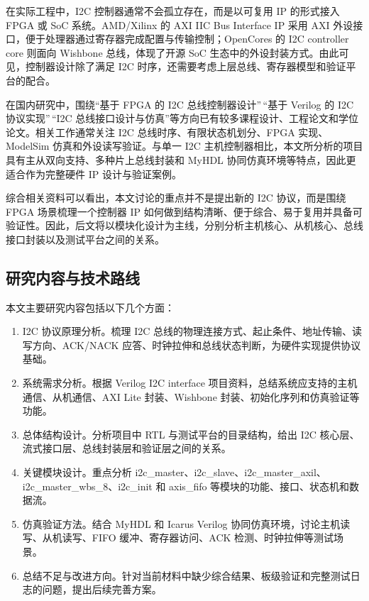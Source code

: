 \documentclass[12pt,a4paper]{article}
\numberwithin{equation}{section}
\providecommand{\tightlist}{%
  \setlength{\itemsep}{0pt}\setlength{\parskip}{0pt}}
\begin{document}
在实际工程中，I2C 控制器通常不会孤立存在，而是以可复用 IP 的形式接入
FPGA 或 SoC 系统。AMD/Xilinx 的 AXI IIC Bus Interface IP 采用 AXI
外设接口，便于处理器通过寄存器完成配置与传输控制；OpenCores 的 I2C
controller core 则面向 Wishbone 总线，体现了开源 SoC
生态中的外设封装方式。由此可见，控制器设计除了满足 I2C
时序，还需要考虑上层总线、寄存器模型和验证平台的配合。

在国内研究中，围绕``基于 FPGA 的 I2C 总线控制器设计''\,``基于 Verilog 的
I2C 协议实现''\,``I2C
总线接口设计与仿真''等方向已有较多课程设计、工程论文和学位论文。相关工作通常关注
I2C 总线时序、有限状态机划分、FPGA 实现、ModelSim
仿真和外设读写验证。与单一 I2C
主机控制器相比，本文所分析的项目具有主从双向支持、多种片上总线封装和
MyHDL 协同仿真环境等特点，因此更适合作为完整硬件 IP 设计与验证案例。

综合相关资料可以看出，本文讨论的重点并不是提出新的 I2C 协议，而是围绕
FPGA 场景梳理一个控制器 IP
如何做到结构清晰、便于综合、易于复用并具备可验证性。因此，后文将以模块化设计为主线，分别分析主机核心、从机核心、总线接口封装以及测试平台之间的关系。

\subsection{研究内容与技术路线}\label{ux7814ux7a76ux5185ux5bb9ux4e0eux6280ux672fux8defux7ebf}

本文主要研究内容包括以下几个方面：

\begin{enumerate}
\def\labelenumi{\arabic{enumi}.}
\tightlist
\item
  I2C 协议原理分析。梳理 I2C
  总线的物理连接方式、起止条件、地址传输、读写方向、ACK/NACK
  应答、时钟拉伸和总线状态判断，为硬件实现提供协议基础。
\item
  系统需求分析。根据 Verilog I2C interface
  项目资料，总结系统应支持的主机通信、从机通信、AXI Lite 封装、Wishbone
  封装、初始化序列和仿真验证等功能。
\item
  总体结构设计。分析项目中 RTL 与测试平台的目录结构，给出 I2C
  核心层、流式接口层、总线封装层和验证层之间的关系。
\item
  关键模块设计。重点分析
  i2c\_master、i2c\_slave、i2c\_master\_axil、i2c\_master\_wbs\_8、i2c\_init
  和 axis\_fifo
  等模块的功能、接口、状态机和数据流。
\item
  仿真验证方法。结合 MyHDL 和 Icarus Verilog
  协同仿真环境，讨论主机读写、从机读写、FIFO 缓冲、寄存器访问、ACK
  检测、时钟拉伸等测试场景。
\item
  总结不足与改进方向。针对当前材料中缺少综合结果、板级验证和完整测试日志的问题，提出后续完善方案。
\end{enumerate}
\end{document}
